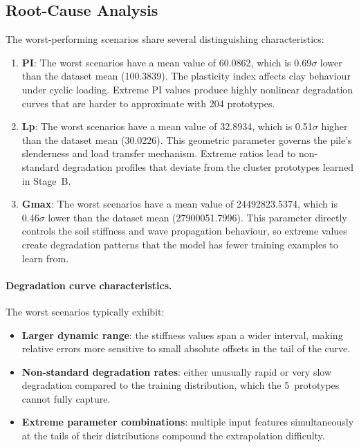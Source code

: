 \documentclass[11pt,a4paper]{article}
\begin{document}
\subsection{Root-Cause Analysis}

The worst-performing scenarios share several distinguishing characteristics:

\begin{enumerate}
\item \textbf{PI}: The worst scenarios have a mean value of 60.0862, which is 0.69$\sigma$ lower than the dataset mean (100.3839). The plasticity index affects clay behaviour under cyclic loading. Extreme PI values produce highly nonlinear degradation curves that are harder to approximate with 204 prototypes.
\item \textbf{Lp}: The worst scenarios have a mean value of 32.8934, which is 0.51$\sigma$ higher than the dataset mean (30.0226). This geometric parameter governs the pile's slenderness and load transfer mechanism. Extreme ratios lead to non-standard degradation profiles that deviate from the cluster prototypes learned in Stage~B.
\item \textbf{Gmax}: The worst scenarios have a mean value of 24492823.5374, which is 0.46$\sigma$ lower than the dataset mean (27900051.7996). This parameter directly controls the soil stiffness and wave propagation behaviour, so extreme values create degradation patterns that the model has fewer training examples to learn from.

\end{enumerate}

\paragraph{Degradation curve characteristics.}
The worst scenarios typically exhibit:
\begin{itemize}[nosep]
    \item \textbf{Larger dynamic range}: the stiffness values span a wider
          interval, making relative errors more sensitive to small absolute
          offsets in the tail of the curve.
    \item \textbf{Non-standard degradation rates}: either unusually rapid
          or very slow degradation compared to the training distribution,
          which the 5~prototypes cannot fully capture.
    \item \textbf{Extreme parameter combinations}: multiple input features
          simultaneously at the tails of their distributions compound the
          extrapolation difficulty.
\end{itemize}
\end{document}
